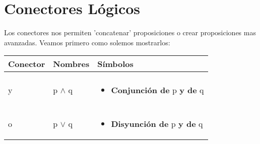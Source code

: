 \documentclass[12pt]{report}                                    %
\begin{document}
        \clearpage
        \section{Conectores Lógicos}

            Los conectores nos permiten 'concatenar' proposiciones o crear proposiciones mas avanzadas. 
            Veamos primero como solemos mostrarlos:

            \begin{longtable}{p{35mm} || p{30mm} || p{80mm}}

                \textbf{\large Conector}
                &
                \textbf{\large Nombres}
                &
                \textbf{\large Símbolos}
                \\[1.5ex]
                \hline\hline
                & & \\                                                                    
                \endhead                                                     

                \large y  &  \large{p $\land$ q}                                    &

                \begin{minipage}[t]{\textwidth}\begin{itemize}
                    \item \textbf{Conjunción de} p \textbf{y de} q
                \end{itemize}\end{minipage}                                                 \\[1.5ex]
                
                \hline & & \\ \large o  &  \large{p $\lor$ q}                               &
                
                \begin{minipage}[t]{\textwidth}\begin{itemize}
                    \item \textbf{Disyunción de} p \textbf{y de} q
                \end{itemize}\end{minipage}                                                 \\[1.5ex]



\end{longtable}
\end{document}
